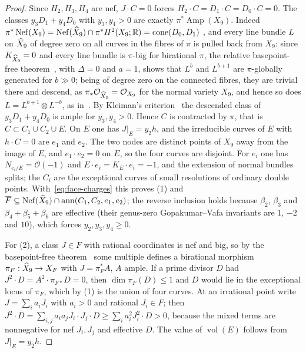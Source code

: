 \begin{proof}
Since $H_2,H_3,H_4$ are nef, $J\cdot C=0$ forces $H_2\cdot C=D_1\cdot C=D_0\cdot C=0$.
The classes $y_3D_1+y_4D_0$ with $y_3,y_4>0$ are exactly
$\pi^*\operatorname{Amp}(X_9)$. Indeed $\pi^*\operatorname{Nef}(X_9)
=\operatorname{Nef}(\widehat X_9)\cap\pi^*H^2(X_9;\mathbb R)=\operatorname{cone}(D_0,D_1)$
\cite[Prop.~4.1]{W26quantum}, and every line bundle $L$ on $\widehat X_9$ of degree zero on all curves in the
fibres of $\pi$ is pulled back from $X_9$: since $K_{\widehat X_9}=0$ and every line bundle is $\pi$-big for
birational $\pi$, the relative basepoint-free theorem~\cite[Thm.~3.24]{KollarMori:1998}, with $\Delta=0$
and $a=1$, shows that $L^b$ and $L^{b+1}$ are $\pi$-globally generated for $b\gg0$; being of degree zero
on the connected fibres, they are trivial there and descend, as $\pi_*\mathcal O_{\widehat X_9}=\mathcal O_{X_9}$
for the normal variety $X_9$, and hence so does $L=L^{b+1}\otimes L^{-b}$, as
in~\cite[proof of Thm.~3.7, Step~9]{KollarMori:1998}. By Kleiman's criterion~\cite{Kleiman:1966} the
descended class of $y_3D_1+y_4D_0$ is ample for $y_3,y_4>0$. Hence $C$ is contracted by $\pi$, that is
$C\subset C_1\cup C_2\cup E$. On $E$ one has $J|_E=y_2h$, and the irreducible curves of
$E$ with $h\cdot C=0$ are $e_1$ and $e_2$. The two nodes are distinct points of $X_9$ away
from the image of $E$, and $e_1\cdot e_2=0$ on $E$, so the four curves are disjoint. For
$e_i$ one has $N_{e_i/E}=\mathcal O(-1)$ and $E\cdot e_i=K_E\cdot e_i=-1$, and the
extension of normal bundles splits; the $C_i$ are the exceptional curves of small
resolutions of ordinary double points. With~\eqref{eq:face-charges} this proves (1) and
$\overline F\subseteq\operatorname{Nef}(\widehat X_9)\cap\operatorname{ann}(C_1,C_2,e_1,e_2)$;
the reverse inclusion holds because $\beta_2$, $\beta_3$ and $\beta_4+\beta_5+\beta_6$ are
effective (their genus-zero Gopakumar--Vafa invariants are $1$, $-2$ and $10$), which forces
$y_2,y_3,y_4\ge0$.

For (2), a class $J\in F$ with rational coordinates is nef and big, so by the
basepoint-free theorem~\cite[Thm.~3.3]{KollarMori:1998} some multiple defines a
birational morphism $\pi_F:\widehat X_9\to X_F$ with $J=\pi_F^*A$, $A$ ample. If a prime divisor
$D$ had $J^2\cdot D=A^2\cdot\pi_{F*}D=0$, then $\dim\pi_F(D)\le1$ and $D$ would lie in the
exceptional locus of $\pi_F$, which by (1) is the union of four curves. At an irrational point
write $J=\sum_ia_iJ_i$ with $a_i>0$ and rational $J_i\in F$; then
$J^2\cdot D=\sum_{i,j}a_ia_jJ_i\cdot J_j\cdot D\ge\sum_ia_i^2J_i^2\cdot D>0$, because the mixed
terms are nonnegative for nef $J_i,J_j$ and effective $D$. The value of $\operatorname{vol}(E)$
follows from $J|_E=y_2h$.


\end{proof}

